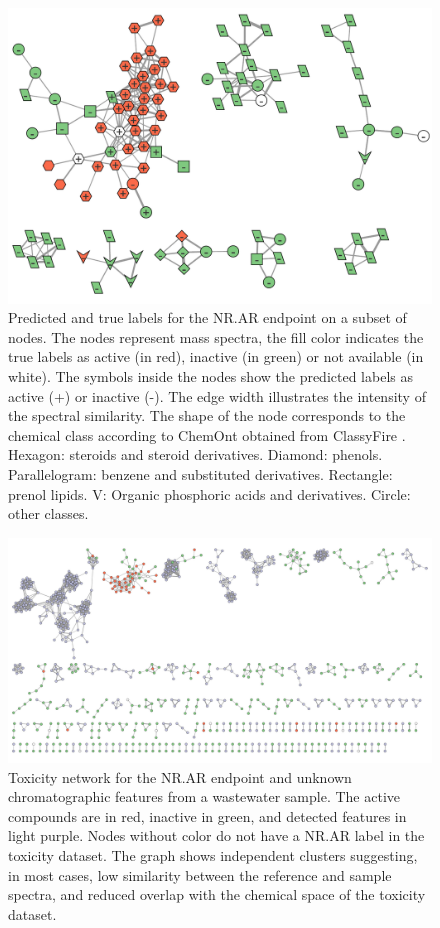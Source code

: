 \begin{figure}
  \includegraphics[width=1\textwidth]{include/img/results/NR.AR_class.pdf}
  \caption{Predicted and true labels for the NR.AR endpoint on a subset of nodes. The nodes represent mass spectra, the fill color indicates the true labels as active (in red), inactive (in green) or not available (in white). The symbols inside the nodes show the predicted labels as active (+) or inactive (-). The edge width illustrates the intensity of the spectral similarity. The shape of the node corresponds to the chemical class according to ChemOnt obtained from ClassyFire \cite{DjoumbouFeunang2016}. Hexagon: steroids and steroid derivatives. Diamond: phenols. Parallelogram: benzene and substituted derivatives. Rectangle: prenol lipids. V: Organic phosphoric acids and derivatives. Circle: other classes.}
  \label{fig:NR.AR_class}
\end{figure}



\begin{figure}
\centering
  \includegraphics[width=1\textwidth]{include/img/appendix/sample/DDApos.pdf}
  \caption{Toxicity network for the NR.AR endpoint and unknown chromatographic \tMS{} features from a wastewater sample. The active compounds are in red, inactive in green, and detected \tMS{} features in light purple. Nodes without color do not have a NR.AR label in the toxicity dataset. The graph shows independent clusters suggesting, in most cases, low similarity between the reference and sample spectra, and reduced overlap with the chemical space of the toxicity dataset.}
  \label{fig:sample}
\end{figure}


